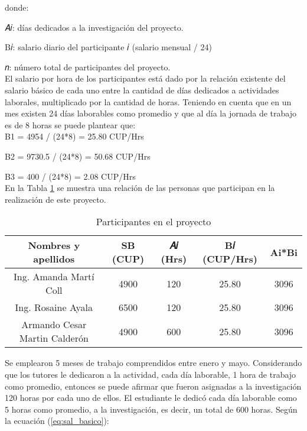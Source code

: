 donde:

𝐴𝑖: días dedicados a la investigación del proyecto.

B𝑖: salario diario del participante 𝑖 (salario mensual / 24)

𝑛: número total de participantes del proyecto.\\

El salario por hora de los participantes está dado por la relación existente del salario
básico de cada uno entre la cantidad de días dedicados a actividades laborales,
multiplicado por la cantidad de horas. Teniendo en cuenta que en un mes existen 24
días laborables como promedio y que al día la jornada de trabajo es de 8 horas se
puede plantear que:\\

B1 = 4954 / (24*8) = 25.80 CUP/Hrs

B2 = 9730.5 / (24*8) = 50.68 CUP/Hrs

B3 = 400 / (24*8) = 2.08 CUP/Hrs\\

En la Tabla \ref{table:participantes_proyecto} se muestra una relación de las personas que participan en la realización de este proyecto. \\


\begin{table}[H]
    \caption{Participantes en el proyecto}
    \label{table:participantes_proyecto}

    \begin{tabular}{|c|c|c|c|c|}
        \hline
        \textbf{Nombres y apellidos}  & \textbf{SB (CUP)} & \textbf{𝐴𝑖 (Hrs)} & \textbf{B𝑖 (CUP/Hrs)} & \textbf{Ai*Bi} \\
        \hline
        Ing. Amanda Martí Coll        & 4900              & 120               & 25.80                 & 3096           \\
        Ing. Rosaine Ayala            & 6500              & 120               & 25.80                 & 3096           \\
        Armando Cesar Martin Calderón & 4900              & 600               & 25.80                 & 3096           \\

        \hline
    \end{tabular}
\end{table}


Se emplearon 5 meses de trabajo comprendidos entre enero y mayo. Considerando que los tutores le dedicaron a la actividad, cada día laborable, 1 hora de trabajo como promedio, entonces se puede afirmar que fueron asignadas a la investigación 120 horas por cada uno de ellos.
El estudiante le dedicó cada día laborable como 5 horas como promedio, a la investigación, es decir, un total de 600 horas.
Según la ecuación (\ref{eq:sal_basico}):\\

